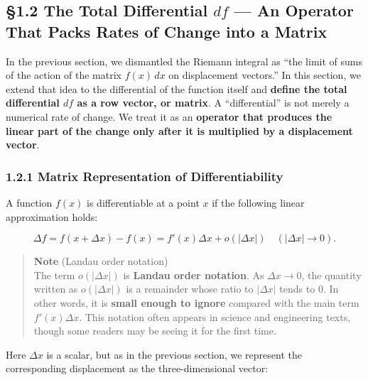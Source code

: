 \documentclass[a4paper,12pt,openany]{book}
\begin{document}
\par\vspace{0.35em}\par

\hypertarget{the-total-differential-df-an-operator-that-packs-rates-of-change-into-a-matrix}{%
\subsection{\texorpdfstring{§1.2 The Total Differential \(df\) — An
Operator That Packs Rates of Change into a
Matrix}{§1.2 The Total Differential df — An Operator That Packs Rates of Change into a Matrix}}\label{the-total-differential-df-an-operator-that-packs-rates-of-change-into-a-matrix}}

In the previous section, we dismantled the Riemann integral as ``the
limit of sums of the action of the matrix \(f(x)\,dx\) on displacement
vectors.'' In this section, we extend that idea to the differential of
the function itself and
\textbf{define the total differential $df$ as a row vector, or matrix}.
A ``differential'' is not merely a numerical rate of change. We treat it
as an
\textbf{operator that produces the linear part of the change only after it is multiplied by a displacement vector}.

\hypertarget{matrix-representation-of-differentiability}{%
\subsubsection{1.2.1 Matrix Representation of
Differentiability}\label{matrix-representation-of-differentiability}}

A function \(f(x)\) is differentiable at a point \(x\) if the following
linear approximation holds:

\[
\Delta f = f(x+\Delta x)-f(x)=f'(x)\Delta x+o(|\Delta x|)\quad(|\Delta x|\to0).
\]

\begin{quote}
\textbf{Note} (Landau order notation)\\
The term \(o(|\Delta x|)\) is \textbf{Landau order notation}. As
\(\Delta x\to0\), the quantity written as \(o(|\Delta x|)\) is a
remainder whose ratio to \(|\Delta x|\) tends to \(0\). In other words,
it is \textbf{small enough to ignore} compared with the main term
\(f'(x)\Delta x\). This notation often appears in science and
engineering texts, though some readers may be seeing it for the first
time.
\end{quote}

Here \(\Delta x\) is a scalar, but as in the previous section, we
represent the corresponding displacement as the three-dimensional
vector:
\end{document}
